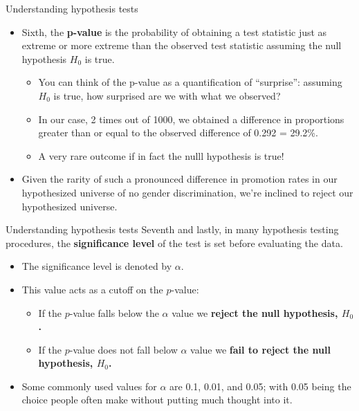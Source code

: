 \documentclass[
  ignorenonframetext,
]{beamer}
\providecommand{\tightlist}{%
  \setlength{\itemsep}{0pt}\setlength{\parskip}{0pt}}
\begin{document}
\begin{frame}{Understanding hypothesis tests}
\label{understanding-hypothesis-tests-8}
\begin{itemize}
\item
  Sixth, the \textbf{p-value} is the probability of obtaining a test
  statistic just as extreme or more extreme than the observed test
  statistic assuming the null hypothesis \(H_0\) is true.

  \begin{itemize}
  \tightlist
  \item
    You can think of the p-value as a quantification of ``surprise'':
    assuming \(H_0\) is true, how surprised are we with what we
    observed?
  \item
    In our case, 2 times out of 1000, we obtained a difference in
    proportions greater than or equal to the observed difference of
    0.292 = 29.2\%.
  \item
    A very rare outcome if in fact the nulll hypothesis is true!
  \end{itemize}
\item
  Given the rarity of such a pronounced difference in promotion rates in
  our hypothesized universe of no gender discrimination, we're inclined
  to reject our hypothesized universe.
\end{itemize}
\end{frame}

\begin{frame}{Understanding hypothesis tests}
\label{understanding-hypothesis-tests-9}
Seventh and lastly, in many hypothesis testing procedures, the
\textbf{significance level} of the test is set before evaluating the
data.

\begin{itemize}
\item
  The significance level is denoted by \(\alpha\).
\item
  This value acts as a cutoff on the \(p\)-value:

  \begin{itemize}
  \tightlist
  \item
    If the \(p\)-value falls below the \(\alpha\) value we
    \textbf{reject the null hypothesis, \(H_0\).}
  \item
    If the \(p\)-value does not fall below \(\alpha\) value we
    \textbf{fail to reject the null hypothesis, \(H_0\).}
  \end{itemize}
\item
  Some commonly used values for \(\alpha\) are 0.1, 0.01, and 0.05; with
  0.05 being the choice people often make without putting much thought
  into it.
\end{itemize}
\end{frame}
\end{document}
